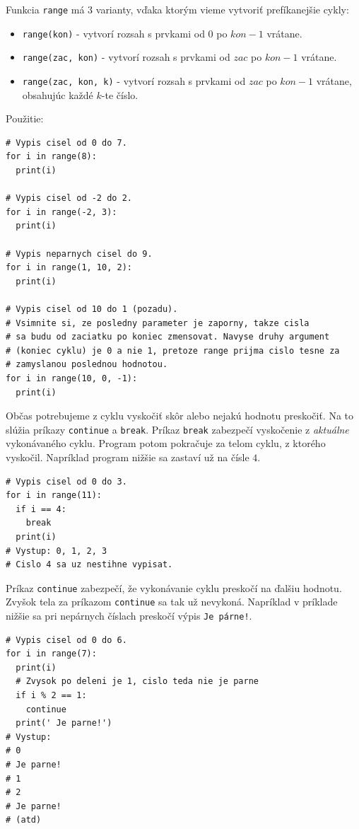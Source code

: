\documentclass{article}
\begin{document}
Funkcia \texttt{range} má 3 varianty, vďaka ktorým vieme vytvoriť prefíkanejšie cykly:
\begin{itemize}
  \item \texttt{range(kon)} - vytvorí rozsah s prvkami od $0$ po $kon - 1$ vrátane.
  \item \texttt{range(zac, kon)} - vytvorí rozsah s prvkami od $zac$ po $kon - 1$ vrátane.
  \item \texttt{range(zac, kon, k)} - vytvorí rozsah s prvkami od $zac$ po $kon - 1$ vrátane,
  obsahujúc každé $k$-te číslo.
\end{itemize} 

Použitie:
\begin{lstlisting}
# Vypis cisel od 0 do 7.
for i in range(8):
  print(i)

# Vypis cisel od -2 do 2.
for i in range(-2, 3):
  print(i)

# Vypis neparnych cisel do 9.
for i in range(1, 10, 2):
  print(i)

# Vypis cisel od 10 do 1 (pozadu).
# Vsimnite si, ze posledny parameter je zaporny, takze cisla
# sa budu od zaciatku po koniec zmensovat. Navyse druhy argument
# (koniec cyklu) je 0 a nie 1, pretoze range prijma cislo tesne za
# zamyslanou poslednou hodnotou.
for i in range(10, 0, -1):
  print(i)
\end{lstlisting}

Občas potrebujeme z cyklu vyskočiť skôr alebo nejakú hodnotu preskočiť. Na to slúžia príkazy \texttt{continue} a \texttt{break}. Príkaz \texttt{break} zabezpečí vyskočenie z \textit{aktuálne} vykonávaného cyklu. Program potom pokračuje za telom cyklu, z ktorého vyskočil. Napríklad program nižšie sa zastaví už na čísle $4$.
\begin{lstlisting}
# Vypis cisel od 0 do 3.
for i in range(11):
  if i == 4:
    break
  print(i)
# Vystup: 0, 1, 2, 3
# Cislo 4 sa uz nestihne vypisat.
\end{lstlisting}

Príkaz \texttt{continue} zabezpečí, že vykonávanie cyklu preskočí na ďalšiu hodnotu. Zvyšok tela za príkazom \texttt{continue} sa tak už nevykoná. Napríklad v príklade nižšie sa pri nepárnych číslach preskočí výpis 
\texttt{Je párne!}.
\begin{lstlisting}
# Vypis cisel od 0 do 6.
for i in range(7):
  print(i)
  # Zvysok po deleni je 1, cislo teda nie je parne
  if i % 2 == 1:
    continue
  print(' Je parne!')
# Vystup:
# 0 
# Je parne!
# 1
# 2
# Je parne!
# (atd)
\end{lstlisting}
\end{document}
